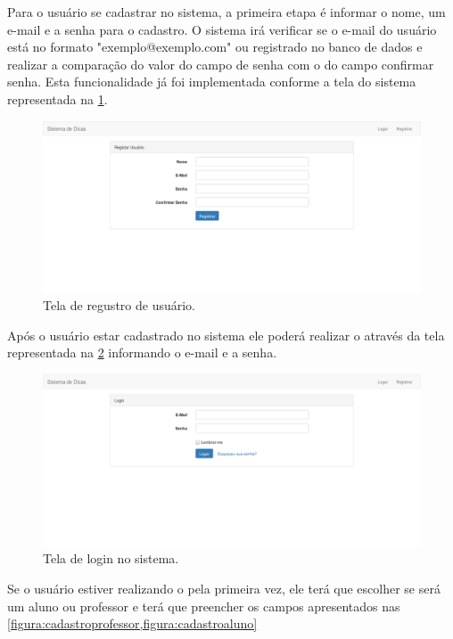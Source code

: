Para o usuário se cadastrar no sistema, a primeira etapa é informar o nome, um e-mail e a senha para o cadastro. O sistema irá verificar se o e-mail do usuário está no formato "exemplo@exemplo.com" ou registrado no banco de dados e realizar a comparação do valor do campo de senha com o do campo confirmar senha. Esta funcionalidade já foi implementada conforme a tela do sistema representada na \cref{figura:registrarusuario}.

\begin{figure}[]
	\captionsetup{justification=centering}
	\includegraphics[width=\linewidth]{imagens/registrarusuario.png}
	\caption{Tela de regustro de usuário.}
	\label{figura:registrarusuario}
\end{figure}

Após o usuário estar cadastrado no sistema ele poderá realizar o  através da tela representada na \cref{figura:logar} informando o e-mail e a senha.

\begin{figure}[]
	\captionsetup{justification=centering}
	\includegraphics[width=\linewidth]{imagens/logar.png}
	\caption{Tela de login no sistema.}
	\label{figura:logar}
\end{figure}

Se o usuário estiver realizando o  pela primeira vez, ele terá que escolher se será um aluno ou professor e terá que preencher os campos apresentados nas \cref{figura:cadastroprofessor,figura:cadastroaluno}


